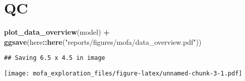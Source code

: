 \documentclass[
]{article}
\newenvironment{Shaded}{\begin{snugshade}}{\end{snugshade}}
\newcommand{\KeywordTok}[1]{\textcolor[rgb]{0.13,0.29,0.53}{\textbf{#1}}}
\newcommand{\NormalTok}[1]{#1}
\newcommand{\OperatorTok}[1]{\textcolor[rgb]{0.81,0.36,0.00}{\textbf{#1}}}
\newcommand{\StringTok}[1]{\textcolor[rgb]{0.31,0.60,0.02}{#1}}
\begin{document}
\begin{Shaded}
\begin{Highlighting}[]
{{{{{\NormalTok{loadings_mutation <-}\StringTok{ }\NormalTok{model}\OperatorTok{@}\NormalTok{expectations}\OperatorTok{$}\NormalTok{W}\OperatorTok{$}\NormalTok{mutation }\OperatorTok{%>%}\StringTok{ }\KeywordTok{as.data.frame}\NormalTok{() }\OperatorTok{%>%}\StringTok{ }\KeywordTok{rownames_to_column}\NormalTok{(}\StringTok{"id"}\NormalTok{) }\OperatorTok{%>%}\StringTok{ }\KeywordTok{as_tibble}\NormalTok{() }\OperatorTok{%>%}\StringTok{ }\NormalTok{janitor}\OperatorTok{::}\KeywordTok{clean_names}\NormalTok{()}
\end{Highlighting}
\end{Shaded}

\hypertarget{qc}{%
\section{QC}\label{qc}}

\begin{Shaded}
\begin{Highlighting}[]
\KeywordTok{plot_data_overview}\NormalTok{(model) }\OperatorTok{+}\StringTok{ }
\StringTok{  }\KeywordTok{ggsave}\NormalTok{(here}\OperatorTok{::}\KeywordTok{here}\NormalTok{(}\StringTok{"reports/figures/mofa/data_overview.pdf"}\NormalTok{))}
\end{Highlighting}
\end{Shaded}

\begin{verbatim}
## Saving 6.5 x 4.5 in image
\end{verbatim}

\texttt{[image: mofa\_exploration\_files/figure-latex/unnamed-chunk-3-1.pdf]}
\end{document}

